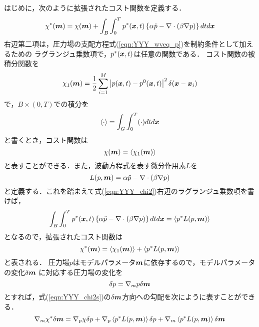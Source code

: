 はじめに，次のように拡張されたコスト関数を定義する．
\begin{equation}
	\chi^*(\mbox{\boldmath $m$})
	=
	\chi(\mbox{\boldmath $m$})
	+
	\int_B\int_0^T 
	p^*(\mbox{\boldmath $x$},t)
	\left\{ 
		\alpha \ddot{p}-\nabla \cdot \left(\beta  \nabla  p \right)
	\right\}
	dt d\mbox{\boldmath $x$}
	\label{eqn:YYY_chi2}
\end{equation}
右辺第二項は，圧力場の支配方程式(\ref{eqn:YYY_wveq_p})を制約条件として加えるための
ラグランジュ乗数項で，$p^*(\mbox{\boldmath $x$},t)$は任意の関数である．
コスト関数の被積分関数を
\begin{equation}
	\chi_1(\mbox{\boldmath $m$})=\frac{1}{2} 
	\sum_{i=1}^M
	\left| p(\mbox{\boldmath $x$},t)-p^0(\mbox{\boldmath $x$},t)\right|^2
	\delta(\mbox{\boldmath $x$}-\mbox{\boldmath $x$}_i )
	\label{eqn:YYY_04}
\end{equation}
で，$B\times (0,T)$での積分を
\begin{equation}
	\left< \cdot \right>=\int_G\int_0^T (\cdot )dtd\mbox{\boldmath $x$}
	\label{eqn:YYY_05}
\end{equation}
と書くとき，コスト関数は
\begin{equation}
	\chi (\mbox{\boldmath $m$})=\left< \chi_1(\mbox{\boldmath $m$} )\right>
	\label{eqn:}
\end{equation}
と表すことができる．また，波動方程式を表す微分作用素$L$を
\begin{equation}
	L(p,\mbox{\boldmath $m$})=\alpha \ddot{p}-\nabla \cdot \left(\beta  \nabla  p \right)
	\label{eqn:YYY_06}
\end{equation}
と定義する．これを踏まえて式(\ref{eqn:YYY_chi2})右辺のラグランジュ乗数項を書けば，
\begin{equation}
	\int_B\int_0^T 
	p^*(\mbox{\boldmath $x$},t)
	\left\{ 
		\alpha \ddot{p}-\nabla \cdot \left(\beta  \nabla  p \right)
	\right\}
	dt d\mbox{\boldmath $x$}
	=
	\left< p^* L(p,\mbox{\boldmath $m$}) \right>
	\label{eqn:}
\end{equation}
となるので，拡張されたコスト関数は
\begin{equation}
	\chi^*(\mbox{\boldmath $m$}) 
	=
	\left< \chi_1 (\mbox{\boldmath $m$})\right>
	+
	\left< p^* L(p,\mbox{\boldmath $m$})\right>
	\label{eqn:YYY_chi2s}
\end{equation}
と表される．
圧力場$p$はモデルパラメータ$\mbox{\boldmath $m$}$に依存するので，モデルパラメータの変化$\delta \mbox{\boldmath $m$}$
に対応する圧力場の変化を
\begin{equation}
	\delta p= \nabla_m p \delta \mbox{\boldmath $m$}
	\label{eqn:YYY_var_p}
\end{equation}
とすれば，式(\ref{eqn:YYY_chi2s})の$\delta \mbox{\boldmath $m$}$方向への勾配を次にように表すことができる．
\begin{equation}
	\nabla_m \chi^* \delta \mbox{\boldmath $m$}
	=
	\nabla_p \chi \delta p
	+
	\nabla_p \left< p^*  L(p,\mbox{\boldmath $m$}) \right> \delta p
	+
	\nabla_m \left< p^*  L(p,\mbox{\boldmath $m$}) \right> \delta \mbox{\boldmath $m$}
	\label{eqn:YYY_dchi2}
\end{equation}
